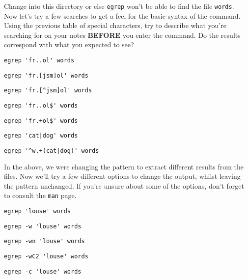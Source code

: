 \begin{steps}
Change into this directory  or else \texttt{egrep} won't be able to find the file \texttt{words}. \\

Now let's try a few searches to get a feel for the basic syntax of the command.
Using the previous table of special characters, try to describe what you're searching for on your notes \textbf{BEFORE} you enter the command.
Do the results correspond with what you expected to see?

\begin{lstlisting}
egrep 'fr..ol' words
\end{lstlisting}
\begin{lstlisting}
egrep 'fr.[jsm]ol' words
\end{lstlisting}
\begin{lstlisting}
egrep 'fr.[^jsm]ol' words
\end{lstlisting}
\begin{lstlisting}
egrep 'fr..ol$' words
\end{lstlisting}
\begin{lstlisting}
egrep 'fr.+ol$' words
\end{lstlisting}
\begin{lstlisting}
egrep 'cat|dog' words
\end{lstlisting}
\begin{lstlisting}
egrep '^w.+(cat|dog)' words
\end{lstlisting}
\end{steps}

\begin{steps}
In the above, we were changing the pattern to extract different results from the files.
Now we'll try a few different options to change the output, whilst leaving the pattern unchanged.
If you're unsure about some of the options, don't forget to consult the \texttt{man} page. \\
\begin{lstlisting}
egrep 'louse' words
\end{lstlisting}
\begin{lstlisting}
egrep -w 'louse' words
\end{lstlisting}
\begin{lstlisting}
egrep -wn 'louse' words
\end{lstlisting}
\begin{lstlisting}
egrep -wC2 'louse' words
\end{lstlisting}
\begin{lstlisting}
egrep -c 'louse' words
\end{lstlisting}
\end{steps}

